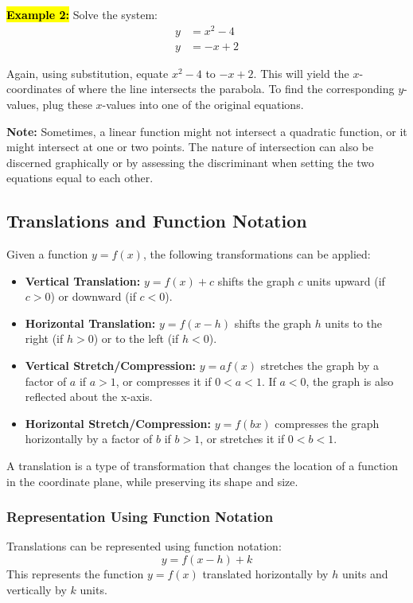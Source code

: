 \documentclass[12pt,a4paper]{article}
\begin{document}
\textbf{\hl{Example 2:}} Solve the system:
\[
\begin{aligned}
    y &= x^2 - 4 \\
    y &= -x + 2
\end{aligned}
\]

Again, using substitution, equate \(x^2 - 4\) to \(-x + 2\). This will yield the \(x\)-coordinates of where the line intersects the parabola. To find the corresponding \(y\)-values, plug these \(x\)-values into one of the original equations.

\textbf{Note:} Sometimes, a linear function might not intersect a quadratic function, or it might intersect at one or two points. The nature of intersection can also be discerned graphically or by assessing the discriminant when setting the two equations equal to each other.

\subsection{Translations and Function Notation}

Given a function \( y = f(x) \), the following transformations can be applied:

\begin{itemize}
    \item \textbf{Vertical Translation:} \( y = f(x) + c \) shifts the graph \(c\) units upward (if \(c > 0\)) or downward (if \(c < 0\)).
    \item \textbf{Horizontal Translation:} \( y = f(x - h) \) shifts the graph \(h\) units to the right (if \(h > 0\)) or to the left (if \(h < 0\)).
    \item \textbf{Vertical Stretch/Compression:} \( y = af(x) \) stretches the graph by a factor of \(a\) if \(a > 1\), or compresses it if \(0 < a < 1\). If \(a < 0\), the graph is also reflected about the x-axis.
    \item \textbf{Horizontal Stretch/Compression:} \( y = f(bx) \) compresses the graph horizontally by a factor of \(b\) if \(b > 1\), or stretches it if \(0 < b < 1\).
\end{itemize}

A translation is a type of transformation that changes the location of a function in the coordinate plane, while preserving its shape and size.

\subsubsection{Representation Using Function Notation}
Translations can be represented using function notation:
\[ y = f(x - h) + k \]
This represents the function \( y = f(x) \) translated horizontally by \( h \) units and vertically by \( k \) units.
\end{document}
